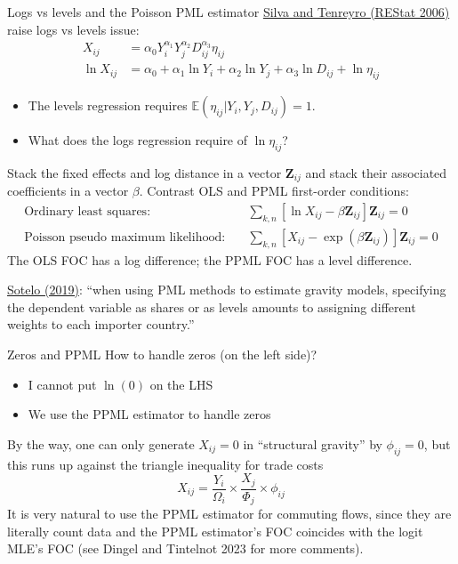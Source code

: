 \documentclass[10pt,notes=hide,aspectratio=169]{beamer}
\begin{document}
\begin{frame}{Logs vs levels and the Poisson PML estimator}
\href{https://personal.lse.ac.uk/tenreyro/LGW.html}{Silva and Tenreyro (REStat 2006)} raise logs vs levels issue:
\begin{align*}
X_{ij} &= \alpha_0 Y_i^{\alpha_1}  Y_j^{\alpha_2}  D_{ij}^{\alpha_3} \eta_{ij}
\\
\ln X_{ij} &= \alpha_0 +{\alpha_1} \ln  Y_i   +{\alpha_2}\ln  Y_j +{\alpha_3} \ln D_{ij} + \ln \eta_{ij}
\end{align*}
\vspace{-8mm}
\begin{itemize}
	\item The levels regression requires $\mathbb{E}\left(\eta_{ij}|Y_i,Y_j,D_{ij}\right)=1$.
	\item What does the logs regression require of $\ln \eta_{ij}$?
\end{itemize}
\smallskip \pause
Stack the fixed effects and log distance in a vector $\mathbf{Z}_{ij}$
and
stack their associated coefficients in a vector $\beta$.
Contrast OLS and PPML first-order conditions:
\begin{align*}
  \text{Ordinary least squares:} \quad
  &
  \sum_{k,n} \left[\ln X_{ij} - \beta \mathbf{Z}_{ij} \right] \mathbf{Z}_{ij}= 0
  \\
  \text{Poisson pseudo maximum likelihood:} \quad
  &
  \sum_{k,n} \left[X_{ij} - \exp\left(\beta \mathbf{Z}_{ij}\right)\right] \mathbf{Z}_{ij}= 0
\end{align*}
The OLS FOC has a log difference; the PPML FOC has a level difference.
{\href{http://www-personal.umich.edu/~ssotelo/research/Sotelo_MPMLE.pdf}{Sotelo (2019)}: ``when using PML methods to estimate gravity models, specifying the dependent variable as shares or as levels amounts to assigning different weights to each importer country.''\par}
\end{frame}
\begin{frame}{Zeros and PPML}
How to handle zeros (on the left side)?
\begin{itemize}
	\item I cannot put $\ln(0)$ on the LHS
	\item We use the PPML estimator to handle zeros
\end{itemize}
\medskip
By the way, one can only generate $X_{ij}=0$ in ``structural gravity'' by $\phi_{ij} = 0$, but this runs up against the triangle inequality for trade costs
\begin{equation*}
X_{ij} = {\frac{Y_i}{\Omega_i}} \times {\frac{X_j}{\Phi_j}} \times \phi_{ij}
\end{equation*}
\medskip
It is very natural to use the PPML estimator for commuting flows,
since they are literally count data and the PPML estimator's FOC coincides with the logit MLE's FOC
(see Dingel and Tintelnot 2023 for more comments).
\end{frame}
\end{document}
